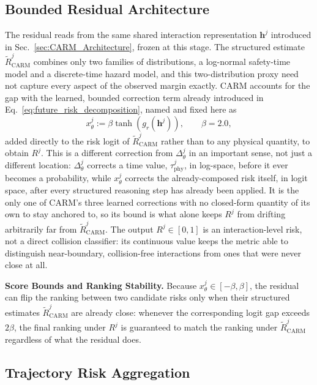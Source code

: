 \documentclass[letterpaper, 10 pt, conference]{ieeeconf}  %
\begin{document}
\subsection{Bounded Residual Architecture}
\label{sec:bounded_residual}

The residual reads from the same shared interaction representation
$\bm h^{j}$ introduced in Sec.~\ref{sec:CARM_Architecture}, frozen at this
stage. The structured estimate $\widetilde R_{\mathrm{CARM}}^{j}$ combines only
two families of distributions, a log-normal safety-time model and a
discrete-time hazard model, and this two-distribution proxy need not
capture every aspect of the observed margin exactly. CARM accounts for the
gap with the learned, bounded correction term already introduced in
Eq.~\eqref{eq:future_risk_decomposition}, named and fixed here as
\begin{equation}
x_\theta^j := \beta\tanh\!\left(g_r(\bm h^{j})\right), \qquad \beta=2.0,
\label{eq:bounded_carm_residual}
\end{equation}
added directly to the risk logit of $\widetilde R_{\mathrm{CARM}}^{j}$
rather than to any physical quantity, to obtain $R^j$. This is a different correction from
$\Delta_\theta^j$ in an important sense, not just a different location:
$\Delta_\theta^j$ corrects a time value, $\tau_{\mathrm{phy}}^{j}$, in
log-space, before it ever becomes a probability, while $x_\theta^j$
corrects the already-composed risk itself, in logit space, after every
structured reasoning step has already been applied. It is the only one of
CARM's three learned corrections with no closed-form quantity of its own
to stay anchored to, so its bound is what alone keeps $R^j$ from drifting
arbitrarily far from $\widetilde R_{\mathrm{CARM}}^{j}$. The output
$R^{j}\in[0,1]$ is an interaction-level risk, not a direct collision
classifier: its continuous value keeps the metric able to distinguish
near-boundary, collision-free interactions from ones that were never
close at all.

\smallskip
\noindent\textbf{Score Bounds and Ranking Stability.} Because
$x_\theta^j\in[-\beta,\beta]$, the residual can flip the ranking between
two candidate risks only when their structured estimates $\widetilde
R_{\mathrm{CARM}}^{j}$ are already close: whenever the corresponding
logit gap exceeds $2\beta$, the final ranking under $R^j$ is guaranteed to
match the ranking under $\widetilde R_{\mathrm{CARM}}^{j}$ regardless of
what the residual does.

\subsection{Trajectory Risk Aggregation}
\label{sec:trajectory_aggregation}
\end{document}
